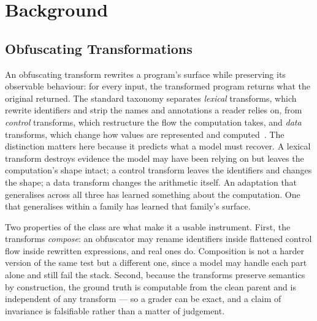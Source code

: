 \section{Background}
\label{sec:background}

\subsection{Obfuscating Transformations}
An obfuscating transform rewrites a program's surface while preserving its observable behaviour:
for every input, the transformed program returns what the original returned. The standard taxonomy
separates \emph{lexical} transforms, which rewrite identifiers and strip the names and annotations a
reader relies on, from \emph{control} transforms, which restructure the flow the computation takes,
and \emph{data} transforms, which change how values are represented and
computed~\cite{collberg1997taxonomy,collberg2002manufacturing}. The distinction matters here because
it predicts what a model must recover. A lexical transform destroys evidence the model may have been
relying on but leaves the computation's shape intact; a control transform leaves the identifiers and
changes the shape; a data transform changes the arithmetic itself. An adaptation that generalises
across all three has learned something about the computation. One that generalises within a family
has learned that family's surface.

Two properties of the class are what make it a usable instrument. First, the transforms
\emph{compose}: an obfuscator may rename identifiers inside flattened control flow inside rewritten
expressions, and real ones do. Composition is not a harder version of the same test but a different
one, since a model may handle each part alone and still fail the stack. Second, because the
transforms preserve semantics by construction, the ground truth is computable from the clean parent
and is independent of any transform --- so a grader can be exact, and a claim of invariance is
falsifiable rather than a matter of judgement.


